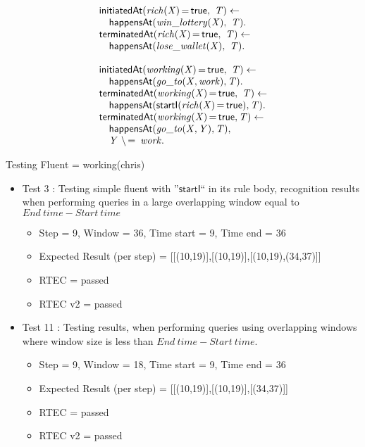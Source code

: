 \documentclass[8pt]{beamer}
\DeclareMathOperator{\val}{=}  %
\def \patsize {}
\def\happensAt{\textsf{\patsize happensAt}}
\def\initiatedAt{\textsf{\patsize initiatedAt}}
\def\terminatedAt{\textsf{\patsize terminatedAt}}
\def\startI{\textsf{\patsize startI}}
\def\true{\textsf{\patsize true}}
\newenvironment{mysplit}%
  {\arraycolsep 0pt \begin{array}{l}}%
  {\end{array}}
\begin{document}
\begin{frame}
\begin{minipage}{0.48\linewidth}
        \begin{align*}
            \begin{mysplit}
                \initiatedAt\mathit{(rich(X)\val\true,\ T) \leftarrow}\\
                \quad    \happensAt\mathit{(win\_lottery(X),\ T).}\\
                \terminatedAt\mathit{(rich(X)\val\true,\ T) \leftarrow}\\
                \quad    \happensAt\mathit{(lose\_wallet(X),\ T)}.\\\\
                \initiatedAt\mathit{(working(X)\val\true,\ T)\leftarrow}\\
                \quad    \happensAt\mathit{(go\_to(X,work),T)}.\\
                \terminatedAt\mathit{(working(X)\val\true,\ T) \leftarrow}\\
                \quad    \happensAt\mathit{(\startI(rich(X)\val\true),T)}.\\
                \terminatedAt\mathit{(working(X)\val\true,T)\leftarrow}\\
                \quad    \happensAt\mathit{(go\_to(X,Y),T)},\\
                \quad	 \mathit{Y\ \backslash\val\ work}.\\
            \end{mysplit}
        \end{align*}
    \end{minipage}
    Testing Fluent = working(chris)\\
    \begin{itemize}
        \item Test 3 : Testing simple fluent with ''$\startI$`` in its rule body, recognition results when performing queries in a large overlapping window equal to $End\ time - Start\ time$
            \begin{itemize}
                \item Step = 9, Window = 36, Time start = 9, Time end = 36
                \item Expected Result (per step) = [[(10,19)],[(10,19)],[(10,19),(34,37)]]
                \item RTEC = passed
                \item RTEC v2 = passed
            \end{itemize}
        \item Test 11 : Testing results, when performing queries using overlapping windows where window size is less than $End\ time - Start\ time$.
            \begin{itemize}
                \item Step = 9, Window = 18, Time start = 9, Time end = 36
                \item Expected Result (per step) = [[(10,19)],[(10,19)],[(34,37)]]
                \item RTEC = passed
                \item RTEC v2 = passed
            \end{itemize}
    \end{itemize}
\end{frame}
\end{document}
